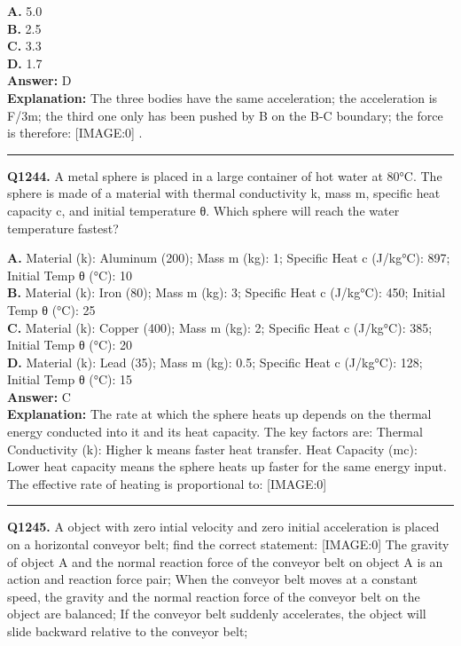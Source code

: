 \documentclass[12pt]{article}
\begin{document}
\textbf{A.} 5.0 \\
\textbf{B.} 2.5 \\
\textbf{C.} 3.3 \\
\textbf{D.} 1.7 \\

\textbf{Answer:} D \\
\textbf{Explanation:} The three bodies have the same acceleration; the acceleration is F/3m; the third one only has been pushed by B on the B-C boundary; the force is therefore:
[IMAGE:0]
.

\hrule
\vspace{1em}


\noindent
\textbf{Q1244.} A metal sphere is placed in a large container of hot water at 80°C. The sphere is made of a material with thermal conductivity k, mass m, specific heat capacity c, and initial temperature θ.
Which sphere will reach the water temperature fastest?



\textbf{A.} Material (k): Aluminum (200); Mass m (kg): 1; Specific Heat c (J/kg\cdot °C): 897; Initial Temp θ (°C): 10 \\
\textbf{B.} Material (k): Iron (80); Mass m (kg): 3; Specific Heat c (J/kg\cdot °C): 450; Initial Temp θ (°C): 25 \\
\textbf{C.} Material (k): Copper (400); Mass m (kg): 2; Specific Heat c (J/kg\cdot °C): 385; Initial Temp θ (°C): 20 \\
\textbf{D.} Material (k): Lead (35); Mass m (kg): 0.5; Specific Heat c (J/kg\cdot °C): 128; Initial Temp θ (°C): 15 \\

\textbf{Answer:} C \\
\textbf{Explanation:} The rate at which the sphere heats up depends on the thermal energy conducted into it and its heat capacity. The key factors are:
Thermal Conductivity (k): Higher k means faster heat transfer.
Heat Capacity (m\cdot c): Lower heat capacity means the sphere heats up faster for the same energy input.
The effective rate of heating is proportional to:
[IMAGE:0]

\hrule
\vspace{1em}


\noindent
\textbf{Q1245.} A object with zero intial velocity and zero initial acceleration is placed on a horizontal conveyor belt; find the correct statement:
[IMAGE:0]
The gravity of object A and the normal reaction force of the conveyor belt on object A is an action and reaction force pair;
When the conveyor belt moves at a constant speed, the gravity and the normal reaction force of the conveyor belt on the object are balanced;
If the conveyor belt suddenly accelerates, the object will slide backward relative to the conveyor belt;
\end{document}
